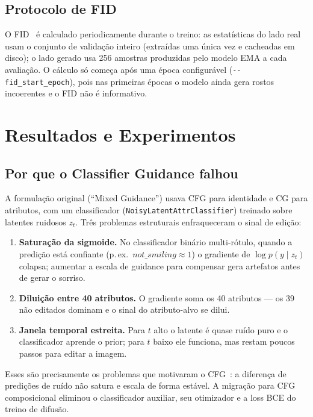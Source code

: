 \documentclass[10pt,twocolumn]{article}
\begin{document}
\subsection{Protocolo de FID}

O FID~\cite{heusel2017} é calculado periodicamente durante o treino: as
estatísticas do lado real usam o conjunto de validação inteiro (extraídas
uma única vez e cacheadas em disco); o lado gerado usa 256 amostras
produzidas pelo modelo EMA a cada avaliação. O cálculo só começa após uma
época configurável (\texttt{-{}-fid\_start\_epoch}), pois nas primeiras
épocas o modelo ainda gera rostos incoerentes e o FID não é informativo.

\section{Resultados e Experimentos}

\subsection{Por que o Classifier Guidance falhou}
\label{sec:cg-falha}

A formulação original (``Mixed Guidance'') usava CFG para identidade e CG
para atributos, com um classificador
(\texttt{NoisyLatentAttrClassifier}) treinado sobre latentes ruidosos
$z_t$. Três problemas estruturais enfraqueceram o sinal de edição:

\begin{enumerate}
  \item \textbf{Saturação da sigmoide.} No classificador binário
    multi-rótulo, quando a predição está confiante (p.\,ex.\
    $\mathit{not\_smiling} \approx 1$) o gradiente de
    $\log p(y \mid z_t)$ colapsa; aumentar a escala de guidance para
    compensar gera artefatos antes de gerar o sorriso.
  \item \textbf{Diluição entre 40 atributos.} O gradiente soma os 40
    atributos --- os 39 não editados dominam e o sinal do atributo-alvo
    se dilui.
  \item \textbf{Janela temporal estreita.} Para $t$ alto o latente é
    quase ruído puro e o classificador aprende o prior; para $t$ baixo
    ele funciona, mas restam poucos passos para editar a imagem.
\end{enumerate}

Esses são precisamente os problemas que motivaram o
CFG~\cite{ho2022cfg}: a diferença de predições de ruído não satura e
escala de forma estável. A migração para CFG composicional eliminou o
classificador auxiliar, seu otimizador e a loss BCE do treino de difusão.
\end{document}
